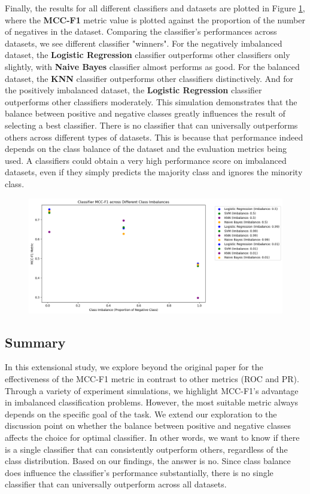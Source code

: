 \documentclass[12pt, oneside]{amsart}
\theoremstyle{definition}
\theoremstyle{remark}
\numberwithin{equation}{section}
\begin{document}
Finally, the results for all different classifiers and datasets are plotted in Figure \ref{simulation4}, where the \textbf{MCC-F1} metric value is plotted against the proportion of the number of negatives in the dataset. Comparing the classifier's performances across datasets, we see different classifier "winners". For the negatively imbalanced dataset, the \textbf{Logistic Regression} classifier outperforms other classifiers only slightly, with \textbf{Naive Bayes} classifier almost performs as good. For the balanced dataset, the \textbf{KNN} classifier outperforms other classifiers distinctively. And for the positively imbalanced dataset, the \textbf{Logistic Regression} classifier outperforms other classifiers moderately. This simulation demonstrates that the balance between positive and negative classes greatly influences the result of selecting a best classifier. There is no classifier that can universally outperforms others across different types of datasets. This is because that performance indeed depends on the class balance of the dataset and the evaluation metrics being used. A classifiers could obtain a very high performance score on imbalanced datasets, even if they simply predicts the majority class and ignores the minority class. 
\begin{figure}[hbt!]
    \centering
    \includegraphics[scale=0.4]{Report/Figure/simulation4.jpg}
    \caption{}
    \label{simulation4}
\end{figure}
\FloatBarrier

\subsection{Summary}
In this extensional study, we explore beyond the original paper for the effectiveness of the MCC-F1 metric in contrast to other metrics (ROC and PR). Through a variety of experiment simulations, we highlight MCC-F1's advantage in imbalanced classification problems. However, the most suitable metric always depends on the specific goal of the task. We extend our exploration to the discussion point on whether the balance between positive and negative classes affects the choice for optimal classifier. In other words, we want to know if there is a single classifier that can consistently outperform others, regardless of the class distribution. Based on our findings, the answer is no. Since class balance does influence the classifier's performance substantially, there is no single classifier that can universally outperform across all datasets. 

\clearpage
\printbibliography
\end{document}
